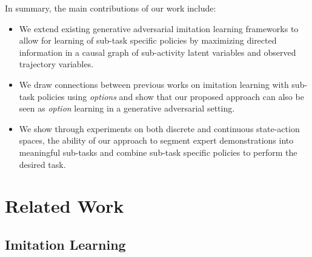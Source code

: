 \documentclass{article} %
\begin{document}
In summary, the main contributions of our work include:

\begin{itemize}
    \item We extend existing generative adversarial imitation learning frameworks to allow for learning of sub-task specific policies by maximizing directed information in a causal graph of sub-activity latent variables and observed trajectory variables.
    
    \item We draw connections between previous works on imitation learning with sub-task policies using \textit{options} and show that our proposed approach can also be seen as \textit{option} learning in a generative adversarial setting.
    
    \item We show through experiments on both discrete and continuous state-action spaces, the ability of our approach to segment expert demonstrations into meaningful sub-tasks and  combine sub-task specific policies to perform the desired task.
\end{itemize}

\section{Related Work}



\subsection{Imitation Learning}
\end{document}

